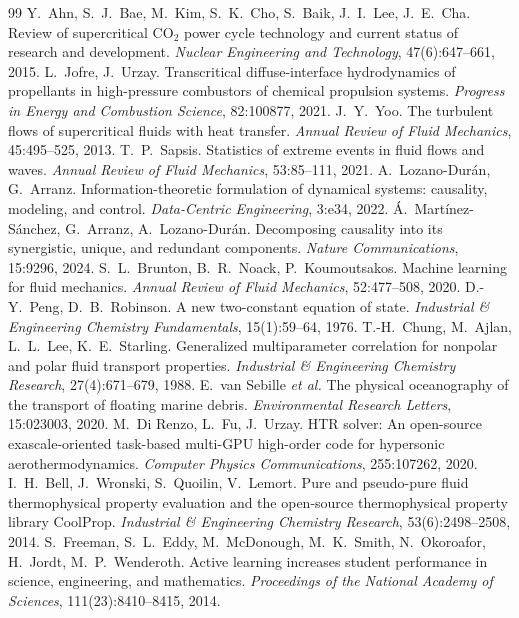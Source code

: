 \documentclass[11pt]{article}
\begin{document}
\begin{thebibliography}{99}\small
{} Y.\ Ahn, S.\ J.\ Bae, M.\ Kim, S.\ K.\ Cho, S.\ Baik, J.\ I.\ Lee, J.\ E.\ Cha.
Review of supercritical CO$_2$ power cycle technology and current status of research and
development. \emph{Nuclear Engineering and Technology}, 47(6):647--661, 2015.
 L.\ Jofre, J.\ Urzay. Transcritical diffuse-interface hydrodynamics
of propellants in high-pressure combustors of chemical propulsion systems. \emph{Progress
in Energy and Combustion Science}, 82:100877, 2021.
 J.\ Y.\ Yoo. The turbulent flows of supercritical fluids with heat
transfer. \emph{Annual Review of Fluid Mechanics}, 45:495--525, 2013.
 T.\ P.\ Sapsis. Statistics of extreme events in fluid flows and waves.
\emph{Annual Review of Fluid Mechanics}, 53:85--111, 2021.
 A.\ Lozano-Dur\'an, G.\ Arranz. Information-theoretic
formulation of dynamical systems: causality, modeling, and control. \emph{Data-Centric
Engineering}, 3:e34, 2022.
 \'A.\ Mart\'inez-S\'anchez, G.\ Arranz, A.\ Lozano-Dur\'an.
Decomposing causality into its synergistic, unique, and redundant components. \emph{Nature
Communications}, 15:9296, 2024.
 S.\ L.\ Brunton, B.\ R.\ Noack, P.\ Koumoutsakos. Machine learning for
fluid mechanics. \emph{Annual Review of Fluid Mechanics}, 52:477--508, 2020.
 D.-Y.\ Peng, D.\ B.\ Robinson. A new two-constant equation of
state. \emph{Industrial \& Engineering Chemistry Fundamentals}, 15(1):59--64, 1976.
 T.-H.\ Chung, M.\ Ajlan, L.\ L.\ Lee, K.\ E.\ Starling. Generalized
multiparameter correlation for nonpolar and polar fluid transport properties.
\emph{Industrial \& Engineering Chemistry Research}, 27(4):671--679, 1988.
 E.\ van Sebille \emph{et al.} The physical oceanography of the
transport of floating marine debris. \emph{Environmental Research Letters}, 15:023003, 2020.
 M.\ Di Renzo, L.\ Fu, J.\ Urzay. HTR solver: An open-source
exascale-oriented task-based multi-GPU high-order code for hypersonic aerothermodynamics.
\emph{Computer Physics Communications}, 255:107262, 2020.
 I.\ H.\ Bell, J.\ Wronski, S.\ Quoilin, V.\ Lemort. Pure and
pseudo-pure fluid thermophysical property evaluation and the open-source thermophysical
property library CoolProp. \emph{Industrial \& Engineering Chemistry Research},
53(6):2498--2508, 2014.
 S.\ Freeman, S.\ L.\ Eddy, M.\ McDonough, M.\ K.\ Smith, N.\ Okoroafor,
H.\ Jordt, M.\ P.\ Wenderoth. Active learning increases student performance in science,
engineering, and mathematics. \emph{Proceedings of the National Academy of Sciences},
111(23):8410--8415, 2014.
\end{thebibliography}
\end{document}
